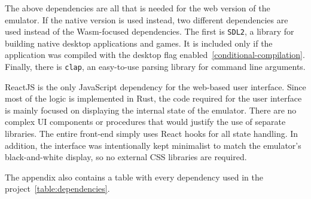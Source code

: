 The above dependencies are all that is needed for the web version of the emulator. If the native version is used instead, two different dependencies are used instead of the Wasm-focused dependencies.
The first is \verb+SDL2+, a library for building native desktop applications and games.
It is included only if the application was compiled with the desktop flag enabled~\ref{conditional-compilation}.
Finally, there is \verb+clap+, an easy-to-use parsing library for command line arguments.


ReactJS is the only JavaScript dependency for the web-based user interface.
Since most of the logic is implemented in Rust, the code required for the user interface is mainly focused on displaying the internal state of the emulator.
There are no complex UI components or procedures that would justify the use of separate libraries.
The entire front-end simply uses React hooks for all state handling.
In addition, the interface was intentionally kept minimalist to match the emulator's black-and-white display, so no external CSS libraries are required.

The appendix also contains a table with every dependency used in the project~\ref{table:dependencies}.
